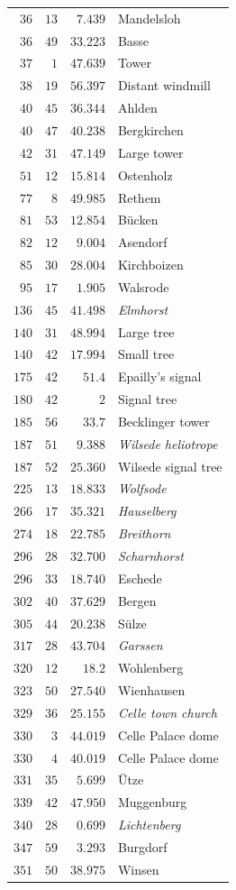 \begin{longtable}{@{}rrrp{.61\linewidth}@{}}
\(36\)&\(13\)&\(7.439\)&\raggedright Mandelsloh\tabularnewline
\(36\)&\(49\)&\(33.223\)&\raggedright Basse\tabularnewline
\(37\)&\(1\)&\(47.639\)&\raggedright Tower\tabularnewline
\(38\)&\(19\)&\(56.397\)&\raggedright Distant windmill\tabularnewline
\(40\)&\(45\)&\(36.344\)&\raggedright Ahlden\tabularnewline
\(40\)&\(47\)&\(40.238\)&\raggedright Bergkirchen\tabularnewline
\(42\)&\(31\)&\(47.149\)&\raggedright Large tower\tabularnewline
\(51\)&\(12\)&\(15.814\)&\raggedright Ostenholz\tabularnewline
\(77\)&\(8\)&\(49.985\)&\raggedright Rethem\tabularnewline
\(81\)&\(53\)&\(12.854\)&\raggedright Bücken\tabularnewline
\(82\)&\(12\)&\(9.004\)&\raggedright Asendorf\tabularnewline
\(85\)&\(30\)&\(28.004\)&\raggedright Kirchboizen\tabularnewline
\(95\)&\(17\)&\(1.905\)&\raggedright Walsrode\tabularnewline
\(136\)&\(45\)&\(41.498\)&\raggedright \textit{Elmhorst}\tabularnewline
\(140\)&\(31\)&\(48.994\)&\raggedright Large tree\tabularnewline
\(140\)&\(42\)&\(17.994\)&\raggedright Small tree\tabularnewline
\(175\)&\(42\)&\(51.4\)&\raggedright Epailly’s signal\tabularnewline
\(180\)&\(42\)&\(2\)&\raggedright Signal tree\tabularnewline
\(185\)&\(56\)&\(33.7\)&\raggedright Becklinger tower\tabularnewline
\(187\)&\(51\)&\(9.388\)&\raggedright \textit{Wilsede heliotrope}\tabularnewline
\(187\)&\(52\)&\(25.360\)&\raggedright Wilsede signal tree\tabularnewline
\(225\)&\(13\)&\(18.833\)&\raggedright \textit{Wolfsode}\tabularnewline
\(266\)&\(17\)&\(35.321\)&\raggedright \textit{Hauselberg}\tabularnewline
\(274\)&\(18\)&\(22.785\)&\raggedright \textit{Breithorn}\tabularnewline
\(296\)&\(28\)&\(32.700\)&\raggedright \textit{Scharnhorst}\tabularnewline
\(296\)&\(33\)&\(18.740\)&\raggedright Eschede\tabularnewline
\(302\)&\(40\)&\(37.629\)&\raggedright Bergen\tabularnewline
\(305\)&\(44\)&\(20.238\)&\raggedright Sülze\tabularnewline
\(317\)&\(28\)&\(43.704\)&\raggedright \textit{Garssen}\tabularnewline
\(320\)&\(12\)&\(18.2\)&\raggedright Wohlenberg\tabularnewline
\(323\)&\(50\)&\(27.540\)&\raggedright Wienhausen\tabularnewline
\(329\)&\(36\)&\(25.155\)&\raggedright \textit{Celle town church}\tabularnewline
\(330\)&\(3\)&\(44.019\)&\raggedright Celle Palace dome\tabularnewline
\(330\)&\(4\)&\(40.019\)&\raggedright Celle Palace dome\tabularnewline
\(331\)&\(35\)&\(5.699\)&\raggedright Ütze\tabularnewline
\(339\)&\(42\)&\(47.950\)&\raggedright Muggenburg\tabularnewline
\(340\)&\(28\)&\(0.699\)&\raggedright \textit{Lichtenberg}\tabularnewline
\(347\)&\(59\)&\(3.293\)&\raggedright Burgdorf\tabularnewline
\(351\)&\(50\)&\(38.975\)&\raggedright Winsen\tabularnewline
\end{longtable}
\endgroup

